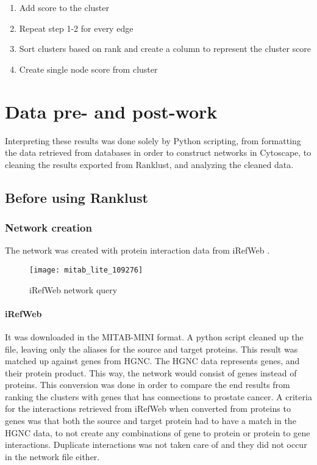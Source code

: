 \begin{enumerate}
    \item Add score to the cluster
    \item Repeat step 1-2 for every edge
    \item Sort clusters based on rank and create a column to represent the
        cluster score
    \item Create single node score from cluster
\end{enumerate}

\chapter{Data pre- and post-work}
Interpreting these results was done solely by Python scripting, from formatting
the data retrieved from databases in order to construct networks in Cytoscape,
to cleaning the results exported from Ranklust, and analyzing the cleaned data. 

\section{Before using Ranklust}
\subsection{Network creation}
The network was created with protein interaction data from iRefWeb
\cite{irefweb}. 

\begin{figure}[H]
    \centering
    \caption{iRefWeb network query}
    \label{fig:irefweb}
    \texttt{[image: mitab\_lite\_109276]}
\end{figure}

\subsubsection{iRefWeb}
It was downloaded in the MITAB-MINI format. A python script cleaned up the file,
leaving only the aliases for the source and target proteins. This result was
matched up against genes from HGNC. The HGNC data represents genes, and their
protein product. This way, the network would consist of genes instead of
proteins. This conversion was done in order to compare the end results from
ranking the clusters with genes that has connections to prostate cancer.
A criteria for the interactions retrieved from iRefWeb when converted from
proteins to genes was that both the source and target protein had to have
a match in the HGNC data, to not create any combinations of gene to protein or
protein to gene interactions. Duplicate interactions was not taken care of and
they did not occur in the network file either.

